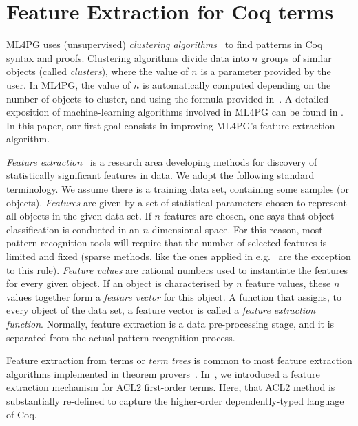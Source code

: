 \section{Feature Extraction for Coq terms}\label{sec:lemmaclustering}

ML4PG uses (unsupervised) \emph{clustering algorithms}~\cite{Bishop} to find patterns in Coq syntax and proofs.
Clustering algorithms %
divide data into $n$ groups of similar objects (called \emph{clusters}), where the value of $n$
is a parameter provided by the user. In ML4PG, the value of $n$ is automatically computed depending on the number 
of objects to cluster, and using the formula provided in~\cite{KHG13,lpar13}. 
A detailed exposition of machine-learning algorithms involved in ML4PG can be found in \cite{KHG13}. In this paper, our first goal consists in improving ML4PG's feature extraction algorithm.


\emph{Feature extraction}~\cite{Bishop} is a research area developing methods for 
discovery of statistically significant features in data. %
We adopt the following standard terminology. %
We assume there is a training data set, containing some samples (or objects). 
\emph{Features} are given by a set of statistical parameters chosen to represent all objects in the given data set.
If $n$ features are chosen, one says that object classification is 
conducted in an $n$-dimensional space. 
For this reason, most pattern-recognition tools will require that %
the number of selected features is limited and fixed (sparse methods, like the ones applied in
e.g.~\cite{lpar-urban,K13,UrbanSPV08} are the exception to this rule). 
\emph{Feature values} are rational numbers used to instantiate the features for every given object.  
If an object is characterised by $n$ feature values, these $n$ values together form a \emph{feature vector} for this object. 
A function that assigns, to every object of the data set, a feature vector is called a \emph{feature extraction function}.
Normally, feature extraction is a data pre-processing stage, and it is separated from the actual pattern-recognition process. %


Feature extraction from terms or \emph{term trees} is common to most feature extraction algorithms implemented
in theorem provers~\cite{lpar13,lpar-urban,K13,UrbanSPV08}. In~\cite{lpar13}, we introduced a feature extraction mechanism
for ACL2 first-order terms. Here, that ACL2 method is substantially re-defined to capture the higher-order dependently-typed language of Coq.



